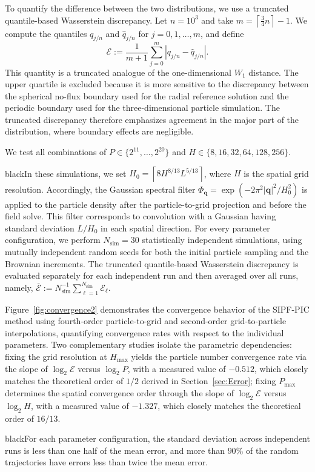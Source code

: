 \documentclass[review,onefignum,onetabnum]{siamart250211}
\begin{document}
To quantify the difference between the two distributions, we use a truncated quantile-based Wasserstein discrepancy. Let $n=10^3$ and take $m=\left\lceil \frac{3}{4}n\right\rceil-1$. We compute the quantiles $q_{j/n}$ and $\hat q_{j/n}$ for $j=0,1,\ldots,m$, and define
\begin{equation}
\mathcal{E}
:=
\frac{1}{m+1}
\sum_{j=0}^{m}
\left|q_{j/n}-\hat q_{j/n}\right|.
\end{equation}
This quantity is a truncated analogue of the one-dimensional $W_1$ distance. The upper quartile is excluded because it is more sensitive to the discrepancy between the spherical no-flux boundary used for the radial reference solution and the periodic boundary used for the three-dimensional particle simulation. The truncated discrepancy therefore emphasizes agreement in the major part of the distribution, where boundary effects are negligible.

We test all combinations of $P \in \{2^{11}, \ldots, 2^{20}\}$ and $H \in \{8, 16, 32, 64, 128, 256\}$. \begin{color}{black}In these simulations, we set $H_{0}=\left\lceil 8H^{8/13}L^{5/13}\right\rceil$, where $H$ is the spatial grid resolution. Accordingly, the Gaussian spectral filter $\Phi_{\mathbf q}=\exp\left(-2\pi^2|\mathbf q|^2/H_{0}^2\right)$ is applied to the particle density after the particle-to-grid projection and before the field solve. This filter corresponds to convolution with a Gaussian having standard deviation $L/H_{0}$ in each spatial direction. For every parameter configuration, we perform $N_{\mathrm{sim}}=30$ statistically independent simulations, using mutually independent random seeds for both the initial particle sampling and the Brownian increments. The truncated quantile-based Wasserstein discrepancy is evaluated separately for each independent run and then averaged over all runs, namely, \(\overline{\mathcal{E}}:=N_{\mathrm{sim}}^{-1}\sum_{\ell=1}^{N_{\mathrm{sim}}}\mathcal{E}_{\ell}\).\end{color}

Figure~\ref{fig:convergence2} demonstrates the convergence behavior of the SIPF-PIC method using fourth-order particle-to-grid and second-order grid-to-particle interpolations, quantifying convergence rates with respect to the individual parameters. Two complementary studies isolate the parametric dependencies: fixing the grid resolution at $H_{\max}$ yields the particle number convergence rate via the slope of $\log_2 \mathcal{E}$ versus $\log_2 P$, with a measured value of $-0.512$, which closely matches the theoretical order of $1/2$ derived in Section~\ref{sec:Error}; fixing $P_{\max}$ determines the spatial convergence order through the slope of $\log_2 \mathcal{E}$ versus $\log_2 H$, with a measured value of $-1.327$, which closely matches the theoretical order of $16/13$. \begin{color}{black}For each parameter configuration, the standard deviation across independent runs is less than one half of the mean error, and more than \(90\%\) of the random trajectories have errors less than twice the mean error.\end{color}
\end{document}
